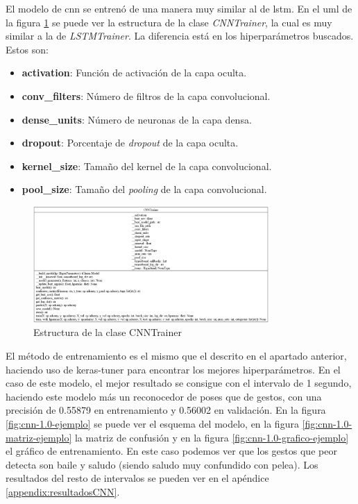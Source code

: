 El modelo de \gls{cnn} se entrenó de una manera muy similar al de \gls{lstm}. En el uml de la figura \ref{fig:cnn-estructura} se puede ver la estructura de la clase \textit{CNNTrainer}, la cual es muy similar a la de \textit{LSTMTrainer}. La diferencia está en los hiperparámetros buscados. Estos son:
\begin{itemize}
    \item \textbf{activation}: Función de activación de la capa oculta.
    \item \textbf{conv\_filters}: Número de filtros de la capa convolucional.
    \item \textbf{dense\_units}: Número de neuronas de la capa densa.
    \item \textbf{dropout}: Porcentaje de \textit{dropout} de la capa oculta.
    \item \textbf{kernel\_size}: Tamaño del kernel de la capa convolucional.
    \item \textbf{pool\_size}: Tamaño del \textit{pooling} de la capa convolucional.
\end{itemize}

\begin{figure}[H]
    \centering
    \includegraphics[width=0.8\textwidth]{Imagenes/Bitmap/classes_CNNTrainer.png}
    \caption{Estructura de la clase CNNTrainer}
    \label{fig:cnn-estructura}
\end{figure}

El método de entrenamiento es el mismo que el descrito en el apartado anterior, haciendo uso de keras-tuner para encontrar los mejores hiperparámetros. En el caso de este modelo, el mejor resultado se consigue con el intervalo de 1 segundo, haciendo este modelo más un reconocedor de poses que de gestos, con una precisión de 0.55879 en entrenamiento y 0.56002 en validación. En la figura \ref{fig:cnn-1.0-ejemplo} se puede ver el esquema del modelo, en la figura \ref{fig:cnn-1.0-matriz-ejemplo} la matriz de confusión y en la figura \ref{fig:cnn-1.0-grafico-ejemplo} el gráfico de entrenamiento. En este caso podemos ver que los gestos que peor detecta son baile y saludo (siendo saludo muy confundido con pelea). Los resultados del resto de intervalos se pueden ver en el apéndice \ref{appendix:resultadosCNN}.

